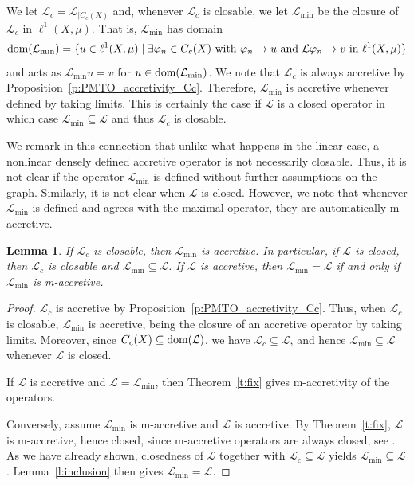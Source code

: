 \documentclass[letterpaper]{article}
\newtheorem{lemma}{Lemma}[section]
\theoremstyle{definition}
\theoremstyle{named}
\numberwithin{equation}{section}
\newcommand{\dom}{\textnormal{dom}} %
\newcommand{\Deltaphi}{\mathcal{L}}
\newcommand{\deltaphim}{\mathcal{L}_{\min}}
\begin{document}
We let $\Deltaphi_c =\Deltaphi_{|C_c(X)}$ and,
whenever $\Deltaphi_c$ is closable, we  let $\deltaphim$ be the closure
of $\Deltaphi_c$ in $\ell^1(X,\mu)$. That is, $\deltaphim$ has domain
$$\dom(\deltaphim) =\{ u \in \ell^1(X,\mu) \mid \exists \varphi_n \in C_c(X) \textup{ with }
\varphi_n \to u \textup { and } \Deltaphi \varphi_n \to v \textup{ in } \ell^1(X,\mu) \}$$
and acts as $\deltaphim u = v$ for $u \in \dom(\deltaphim)$. 
We note that $\Deltaphi_c$ is always accretive by Proposition~\ref{p:PMTO_accretivity_Cc}.
Therefore, $\deltaphim$ is accretive whenever defined by taking limits. 
This is certainly the case if $\Deltaphi$ is a closed operator in which case 
$\deltaphim \subseteq \Deltaphi$ and thus $\Deltaphi_c$ is closable.

We remark in this connection that unlike what happens in the linear case, a nonlinear densely
defined accretive operator is not necessarily closable. 
Thus, it is not clear if the operator $\deltaphim$ is defined 
without further assumptions on the graph. 
Similarly, it is not clear when $\Deltaphi$ is closed. 
However, we note that whenever $\deltaphim$ is defined and agrees with the maximal
operator, they are automatically m-accretive.
\begin{lemma}\label{l:min_equal_accretive}
If $\Deltaphi_c$ is closable, then $\deltaphim$ is accretive. 
In particular, if $\Deltaphi$ is closed, then $\Deltaphi_c$ is closable
and $\deltaphim \subseteq \Deltaphi$. If $\Deltaphi$ is accretive, then
$\deltaphim =\Deltaphi$ if and only if $\deltaphim$ is m-accretive.
\end{lemma}

\begin{proof}
$\Deltaphi_c$ is accretive by Proposition~\ref{p:PMTO_accretivity_Cc}. Thus, when
$\Deltaphi_c$ is closable, $\deltaphim$ is accretive, being the closure of an accretive
operator by taking limits. Moreover, since
$C_c(X) \subseteq \dom(\Deltaphi)$, we have $\Deltaphi_c \subseteq \Deltaphi$, and hence
$\deltaphim \subseteq \Deltaphi$ whenever $\Deltaphi$ is closed.

If $\Deltaphi$ is accretive and $\Deltaphi=\deltaphim$, then Theorem~\ref{t:fix} gives
m-accretivity of the operators.

Conversely, assume $\deltaphim$ is m-accretive and $\Deltaphi$ is accretive. By
Theorem~\ref{t:fix}, $\Deltaphi$ is m-accretive, hence closed, since m-accretive
operators are always closed, see \cite[III.~Proposition~3.4]{barbu2010nonlinear}. As
we have already shown, closedness of $\Deltaphi$ together with $\Deltaphi_c \subseteq \Deltaphi$
yields $\deltaphim \subseteq \Deltaphi$. Lemma~\ref{l:inclusion} then gives
$\deltaphim =\Deltaphi$.
\end{proof}
\end{document}
